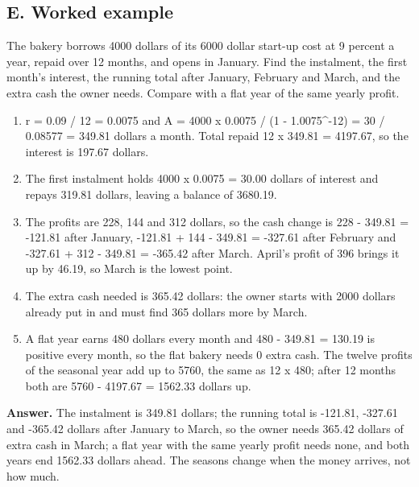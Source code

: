 \documentclass[11pt,a4paper]{article}
\begin{document}
\subsection*{E. Worked example}
The bakery borrows 4000 dollars of its 6000 dollar start-up cost at 9 percent a year, repaid over 12 months, and opens in January. Find the instalment, the first month's interest, the running total after January, February and March, and the extra cash the owner needs. Compare with a flat year of the same yearly profit.
\begin{enumerate}[nosep]
\item r = 0.09 / 12 = 0.0075 and A = 4000 x 0.0075 / (1 - 1.0075\textasciicircum{}-12) = 30 / 0.08577 = 349.81 dollars a month. Total repaid 12 x 349.81 = 4197.67, so the interest is 197.67 dollars.
\item The first instalment holds 4000 x 0.0075 = 30.00 dollars of interest and repays 319.81 dollars, leaving a balance of 3680.19.
\item The profits are 228, 144 and 312 dollars, so the cash change is 228 - 349.81 = -121.81 after January, -121.81 + 144 - 349.81 = -327.61 after February and -327.61 + 312 - 349.81 = -365.42 after March. April's profit of 396 brings it up by 46.19, so March is the lowest point.
\item The extra cash needed is 365.42 dollars: the owner starts with 2000 dollars already put in and must find 365 dollars more by March.
\item A flat year earns 480 dollars every month and 480 - 349.81 = 130.19 is positive every month, so the flat bakery needs 0 extra cash. The twelve profits of the seasonal year add up to 5760, the same as 12 x 480; after 12 months both are 5760 - 4197.67 = 1562.33 dollars up.
\end{enumerate}
\textbf{Answer.} The instalment is 349.81 dollars; the running total is -121.81, -327.61 and -365.42 dollars after January to March, so the owner needs 365.42 dollars of extra cash in March; a flat year with the same yearly profit needs none, and both years end 1562.33 dollars ahead. The seasons change when the money arrives, not how much.
\end{document}

